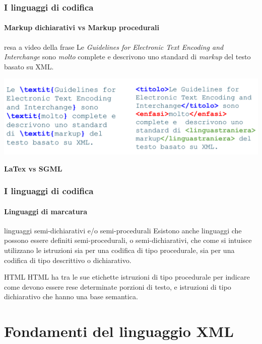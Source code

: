 \documentclass{beamer}
\begin{document}
\begin{frame}
	\frametitle{I linguaggi di codifica}
	\framesubtitle {Markup dichiarativi vs Markup procedurali}
	\addtocounter{nframe}{1}
	\begin{block}{resa a video della frase}
		Le \textit{Guidelines for Electronic Text Encoding and Interchange} sono \textit{molto} complete e descrivono uno standard di \textit{markup} del testo basato su XML.
	\end{block}

	\begin{center}
		\includegraphics[width=.85\textwidth]{imgs/xml-Procedurale-Dichiarativo.png}
	\end{center}
    \begin{center}
    \textbf{LaTex vs SGML}
    \end{center}

\end{frame}

\begin{frame}
	\frametitle{I linguaggi di codifica}
	\framesubtitle{Linguaggi di marcatura}
	\addtocounter{nframe}{1}

	\begin{block}{linguaggi semi-dichiarativi e/o semi-procedurali}
		Esistono anche linguaggi che possono essere definiti
		semi-procedurali, o semi-dichiarativi, che come si intuisce utilizzano le istruzioni sia
		per una codifica di tipo procedurale, sia per una codifica di tipo descrittivo o
		dichiarativo.
	\end{block}

	\begin{block}{HTML}
		HTML ha tra le sue etichette istruzioni di tipo procedurale per indicare come devono essere rese determinate
		porzioni di testo, e istruzioni di tipo dichiarativo che hanno una base semantica.
	\end{block}



\end{frame}


\section{Fondamenti del linguaggio XML}

\end{document}
